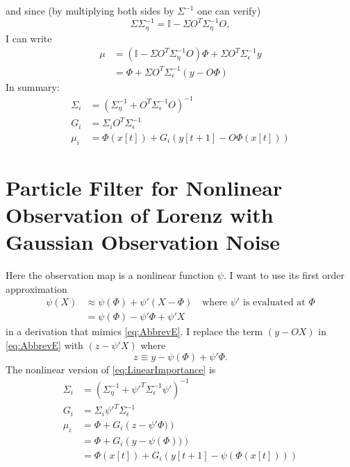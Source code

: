 \documentclass[12pt]{article}
\newcommand{\id}{\mathbb{I}}
\begin{document}
and since (by multiplying both sides by $\Sigma^{-1}$ one can verify)
\begin{equation*}
  \Sigma \Sigma_\eta^{-1} = \id - \Sigma O^T \Sigma_\eta^{-1} O,
\end{equation*}
I can write
\begin{align*}
  \mu &= \left( \id - \Sigma O^T \Sigma_\eta^{-1} O \right) \Phi +
        \Sigma O^T \Sigma_\epsilon^{-1} y \\
      &= \Phi + \Sigma O^T \Sigma_\epsilon^{-1} (y - O\Phi)
\end{align*}
In summary:
\begin{subequations}
  \label{eq:LinearImportance}
  \begin{align}
    \Sigma_i &= \left( \Sigma_\eta^{-1} + O^T \Sigma_\epsilon^{-1} O
               \right)^{-1} \\
    G_i &= \Sigma_i O^T \Sigma_\epsilon^{-1} \\
    \mu_i &= \Phi(x[t]) + G_i \left(y[t+1] - O \Phi(x[t]) \right)
  \end{align}
\end{subequations}

\section{Particle Filter for Nonlinear Observation of Lorenz with
  Gaussian Observation Noise}
\label{sec:nonlinear}

Here the observation map is a nonlinear function $\psi$.  I want to
use its first order approximation
\begin{align*}
  \psi(X) &\approx \psi(\Phi) + \psi' (X-\Phi) \quad \text{where
            $\psi'$ is evaluated at $\Phi$}\\
  &= \psi(\Phi) - \psi'\Phi + \psi' X
\end{align*}
in a derivation that mimics \eqref{eq:AbbrevE}.  I replace the term
$(y-OX)$ in \eqref{eq:AbbrevE} with $(z - \psi'X)$ where
\begin{equation*}
  z \equiv y - \psi(\Phi) + \psi' \Phi.
\end{equation*}
The nonlinear version of \eqref{eq:LinearImportance} is
\begin{subequations}
  \begin{align}
    \Sigma_i &= \left( \Sigma_\eta^{-1} + \psi'^T \Sigma_\epsilon^{-1} \psi'
               \right)^{-1} \\
    G_i &= \Sigma_i \psi'^T \Sigma_\epsilon^{-1} \\ \nonumber
    \mu_i &= \Phi + G_i \left(z - \psi' \Phi) \right) \\ \nonumber
             &= \Phi + G_i \left(y - \psi(\Phi) ) \right) \\
             &= \Phi(x[t]) + G_i \left(y[t+1] - \psi(\Phi(x[t]))
               \right)
  \end{align}
\end{subequations}
\end{document}
